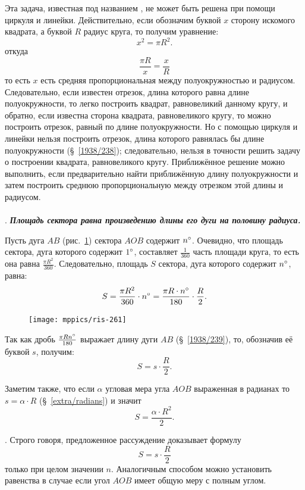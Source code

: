 \documentclass[twoside]{book}
\begin{document}
Эта задача, известная под названием , не может быть решена при помощи циркуля и линейки.
Действительно, если обозначим буквой $x$ сторону искомого квадрата, а буквой $R$ радиус круга, то получим уравнение:
\[x^2=\pi R^2.\]
откуда
\[\frac{\pi R}{x}=\frac{x}{R}\]
то есть
$x$ есть средняя пропорциональная между полуокружностью и радиусом.
Следовательно, если известен отрезок, длина которого равна длине полуокружности, то легко построить квадрат, равновеликий данному кругу, и обратно, если известна сторона квадрата, равновеликого кругу, то можно построить отрезок, равный по длине полуокружности.
Но с помощью циркуля и линейки нельзя построить отрезок, длина которого равнялась бы длине полуокружности (§~\ref{1938/238});
следовательно, нельзя в точности решить задачу о построении квадрата, равновеликого кругу.
Приближённое решение можно выполнить, если предварительно найти приближённую длину полуокружности и затем построить среднюю пропорциональную между отрезком этой длины и радиусом.

\paragraph{}\label{1938/268}
\mbox{.}
\textbf{\emph{Площадь сектора равна произведению длины его дуги на половину радиуса.}}

Пусть дуга $AB$ (рис.~\ref{1938/ris-261}) сектора $AOB$ содержит $n\degree$.
Очевидно, что площадь сектора, дуга которого содержит $1\degree$, составляет $\tfrac1{360}$ часть площади круга, то есть она равна $\frac{\pi R^2}{360}$.
Следовательно, площадь $S$ сектора, дуга которого содержит $n\degree$, равна:
\[S=\frac{\pi R^2}{360}\cdot n\degree=\frac{\pi R\cdot  n\degree}{180}\cdot \frac R2.\]

\begin{figure}
\vskip-4mm
\centering
\texttt{[image: mppics/ris-261]}
\caption{}\label{1938/ris-261}
\end{figure}

\noindent
Так как дробь $\frac{\pi R n\degree}{180}$ выражает длину дуги $AB$ (§~\ref{1938/239}), то, обозначив
её буквой $s$, получим:
\[S=s\cdot \frac R2.\]

Заметим также, что если $\alpha$ угловая мера угла $AOB$ выраженная в радианах то $s=\alpha\cdot R$ (§~\ref{extra/radians}) и значит 
\[S=\frac{\alpha\cdot R^2}2.\]

\medskip
\mbox{.}
Строго говоря, предложенное рассуждение доказывает формулу
\[S=s\cdot \frac R2\]
только при целом значении $n$.
Аналогичным способом можно установить равенства в случае если угол $AOB$ имеет общую меру с полным углом.
\end{document}
